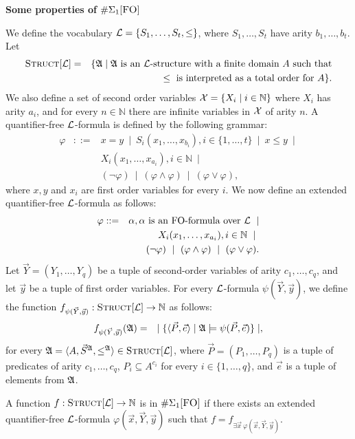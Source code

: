 \documentclass[12pt]{article}
\def\E1{\#\Sigma_1[\mbox{{\sc FO}}]}
\def\Truc{\textsc{Struct}[\L]}
\def\A{{\frak A}}
\def\L{{\cal L}}
\def\N{\mathbb{N}}
\def\P{\vec{P}}
\def\S{\vec{S}}
\def\Y{\vec{Y}}
\def\e{\vec{e}} %
\def\x{\vec{x}} %
\def\y{\vec{y}} %
\begin{document}
\begin{center}
{ \LARGE \bf
  Some properties of $\E1$
}
\end{center}

We define the vocabulary $\L = \{ S_1,\dots,S_t, \leq \}$, where $S_1,\dots,S_t$ have arity $b_1,\dots,b_t$. Let
\begin{eqnarray*}
\Truc &=& \{\A \mid \A \text{ is an } \L \text{-structure with a finite domain } A \text{ such that} \\
&& \leq \text{ is interpreted as a total order for } A \}.
\end{eqnarray*}
We also define a set of second order variables ${\cal X} = \{ X_i \mid i\in\N \}$ where $X_i$ has arity $a_i$, and for every $n \in \N$ there are infinite variables in ${\cal X}$ of arity $n$. A quantifier-free $\L$-formula is defined by the following grammar:
\begin{eqnarray*}
\varphi &::=& x = y \ \mid \ S_i(x_1,\dots,x_{b_i}), i \in \{1,\dots,t\} \ \mid \ x \leq y \ \mid \\
&& X_i(x_1,\dots,x_{a_i}), i\in\N \ \mid \\ 
&& (\neg \varphi) \ \mid \ (\varphi \wedge \varphi) \ \mid \ (\varphi \vee \varphi),
\end{eqnarray*}
where $x,y$ and $x_i$ are first order variables for every $i$. We now define an extended quantifier-free $\L$-formula as follows:
\begin{eqnarray*}
\varphi &::=& \alpha, \alpha \text{ is an FO-formula over } \L  \ \mid \\
&& X_i(x_1,\dots,x_{a_i}), i\in\N \ \mid \ \\
&& (\neg \varphi) \ \mid \ (\varphi \wedge \varphi) \ \mid \ (\varphi \vee \varphi).
\end{eqnarray*}
Let $\Y = (Y_1,\dots,Y_q)$ be a tuple of second-order variables of arity $c_1,\ldots,c_q$, and let $\y$ be a tuple of first order variables. For every $\L$-formula $\psi(\Y,\y)$, we define the function $f_{\psi(\Y,\y)}:\Truc \to \N$ as follows:
\begin{eqnarray*}
f_{\psi(\Y,\y)}(\A) &=& \mid \{ \langle \P, \e \rangle \mid \A \models \psi(\P,\e) \} \mid,
\end{eqnarray*}
for every $\A = \langle A, \S^{\A}, \leq^{\A} \rangle \in \Truc$, where $\P = (P_1,\ldots,P_q)$ is a tuple of predicates of arity $c_1,\ldots,c_q$, $P_i \subseteq A^{c_i}$ for every $i \in \{1,\ldots,q\}$, and $\e$ is a tuple of elements from $\A$.

A function $f:\Truc \to \N$ is in $\E1$ if there exists an extended quantifier-free $\L$-formula $\varphi(\x,\Y,\y)$ such that $f = f_{\exists \x \: \varphi(\x,\Y,\y)}.$\\
\end{document}
